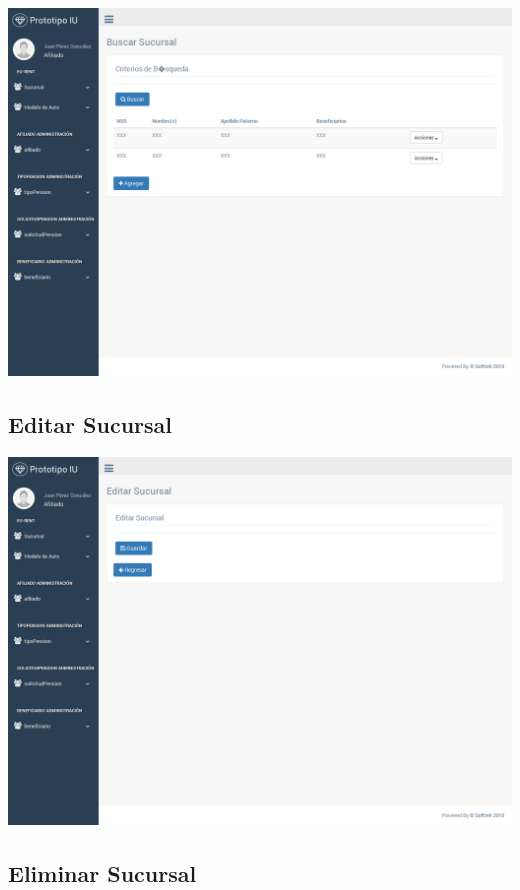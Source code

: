 \includegraphics[width=\linewidth]{ui-prototype/SucursalServices/BuscarSucursalPage.png}

\subsection{Editar Sucursal}

\includegraphics[width=\linewidth]{ui-prototype/SucursalServices/EditarSucursalPage.png}

\subsection{Eliminar Sucursal}

